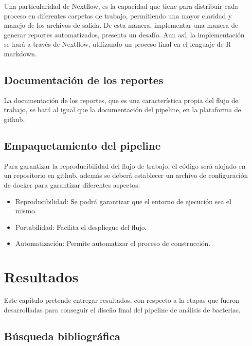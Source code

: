 \documentclass[12pt]{article}
\begin{document}
Una particularidad de Nextflow, es la capacidad que tiene para 
distribuir cada proceso en diferentes carpetas de trabajo, 
permitiendo una mayor claridad y manejo de los archivos de salida. 
De esta manera, implementar una manera de generar reportes 
automatizados, presenta un desafío. Aun así, la implementación 
se hará a través de Nextflow, utilizando un proceso final en el 
lenguaje de R markdown.

\subsection*{Documentación de los reportes}

La documentación de los reportes, que es una característica propia del flujo de 
trabajo, se hará al igual que la documentación del pipeline, en la 
plataforma de github.

\subsection*{Empaquetamiento del pipeline}

Para garantizar la reproducibilidad del flujo de trabajo, el código será alojado en un repositorio en github, además se deberá establecer un archivo de configuración de docker para garantizar diferentes aspectos:

\begin{itemize}
    \item Reproducibilidad: Se podrá garantizar que el entorno de ejecución sea el mismo. 
    
    \item Portabilidad: Facilita el despliegue del flujo.
    
    \item Automatización: Permite automatizar el proceso de construcción.
\end{itemize}


\newpage
\section{Resultados}

Este capítulo pretende entregar resultados, con respecto a 
la etapas que fueron desarrolladas para conseguir el diseño 
final del pipeline de análisis de bacterias.

\subsection{Búsqueda bibliográfica}
\end{document}
